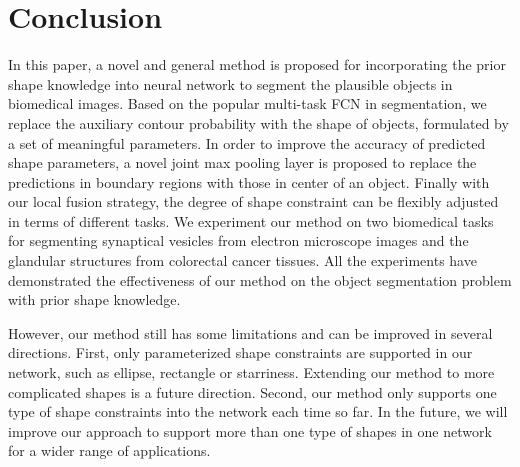 \documentclass[10pt,twocolumn,letterpaper]{article}
\begin{document}






\section{Conclusion}
In this paper, a novel and general method is proposed for incorporating the prior shape knowledge into neural network to segment the plausible objects in biomedical images.
Based on the popular multi-task FCN in segmentation, we replace the auxiliary contour probability with the shape of objects, formulated by a set of meaningful parameters.
In order to improve the accuracy of predicted shape parameters, a novel joint max pooling layer is proposed to replace the predictions in boundary regions with those in center of an object.
Finally with our local fusion strategy, the degree of shape constraint can be flexibly adjusted in terms of different tasks.
We experiment our method on two biomedical tasks for segmenting synaptical vesicles from electron microscope images and the glandular structures from colorectal cancer tissues.
All the experiments have demonstrated the effectiveness of our method on the object segmentation problem with prior shape knowledge.


However, our method still has some limitations and can be improved in several directions. 
First, only parameterized shape constraints are supported in our network, such as ellipse, rectangle or starriness.
%
Extending our method to more complicated shapes is a future direction.
%
Second, our method only supports one type of shape constraints into the network each time so far.
%
In the future, we will improve our approach to support more than one type of shapes in one network for a wider range of applications.



{\small


}
\end{document}
